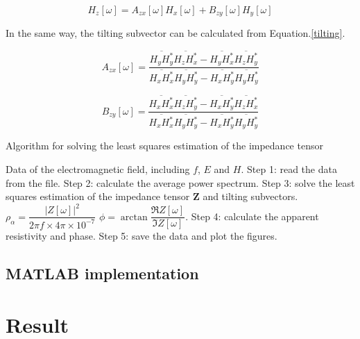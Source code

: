 \documentclass[9pt,a4paper,twoside]{rho-class/rho}
\begin{document}
\begin{equation}
    \label{tilting}
    H_z[\omega]=A_{zx}[\omega]H_x[\omega]+B_{zy}[\omega]H_y[\omega]
\end{equation}

In the same way, the tilting subvector can be calculated from Equation.\eqref{tilting}.

\begin{equation}
    \label{azx}
    A_{zx}[\omega]=\dfrac{\overline{H_yH_y^\ast}\overline{H_zH_x^\ast}-\overline{H_yH_x^\ast}\overline{H_zH_y^\ast}}{\overline{H_xH_x^\ast}\overline{H_yH_y^\ast}-\overline{H_xH_y^\ast}\overline{H_yH_y^\ast}}
\end{equation}

\begin{equation}
    \label{bzy}
    B_{zy}[\omega]=\dfrac{\overline{H_xH_x^\ast}\overline{H_zH_y^\ast}-\overline{H_xH_y^\ast}\overline{H_zH_x^\ast}}{\overline{H_xH_x^\ast}\overline{H_yH_y^\ast}-\overline{H_xH_y^\ast}\overline{H_yH_y^\ast}}
\end{equation}

\begin{algorithm}[H]
    \caption{Algorithm for solving the least squares estimation of the impedance tensor}
    \label{alg:z}
    \begin{algorithmic}[1]
        \Require Data of the electromagnetic field, including $f$, $E$ and $H$.
        \State Step 1: read the data from the file.
        \State Step 2: calculate the average power spectrum.
        \State Step 3: solve the least squares estimation of the impedance tensor $\mathbf{Z}$ and tilting subvectors.
        \State $\rho_\alpha=\dfrac{|Z[\omega]|^2}{2\pi f\times 4\pi\times 10^{-7}}$
        \State $\phi=\arctan\dfrac{\mathfrak{R}Z[\omega]}{\mathfrak{I}Z[\omega]}$.
        \State Step 4: calculate the apparent resistivity and phase.
        \State Step 5: save the data and plot the figures.
    \end{algorithmic}
\end{algorithm}

\subsection{MATLAB implementation}



\section{Result}
\end{document}

